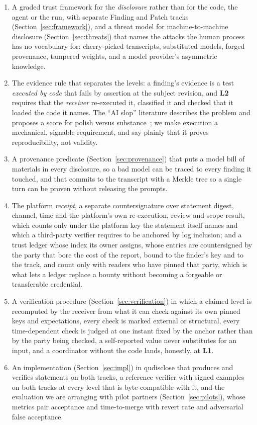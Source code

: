 \documentclass[11pt]{article}
\newcommand{\lvl}[1]{\textbf{L#1}}
\begin{document}
\begin{enumerate}
  \item A graded trust framework for the \emph{disclosure} rather than for the code, the agent or the run, with separate Finding and Patch tracks (Section~\ref{sec:framework}), and a threat model for machine-to-machine disclosure (Section~\ref{sec:threats}) that names the attacks the human process has no vocabulary for: cherry-picked transcripts, substituted models, forged provenance, tampered weights, and a model provider's asymmetric knowledge.
  \item The evidence rule that separates the levels: a finding's evidence is a test \emph{executed by code} that fails by assertion at the subject revision, and \lvl{2} requires that the \emph{receiver} re-executed it, classified it and checked that it loaded the code it names. The ``AI slop'' literature describes the problem and proposes a score for polish versus substance~\cite{slopsurvey}; we make execution a mechanical, signable requirement, and say plainly that it proves reproducibility, not validity.
  \item A provenance predicate (Section~\ref{sec:provenance}) that puts a model bill of materials in every disclosure, so a bad model can be traced to every finding it touched, and that commits to the transcript with a Merkle tree so a single turn can be proven without releasing the prompts.
  \item The platform \emph{receipt}, a separate countersignature over statement digest, channel, time and the platform's own re-execution, review and scope result, which counts only under the platform key the statement itself names and which a third-party verifier requires to be anchored by log inclusion; and a trust ledger whose index its owner assigns, whose entries are countersigned by the party that bore the cost of the report, bound to the finder's key and to the track, and count only with readers who have pinned that party, which is what lets a ledger replace a bounty without becoming a forgeable or transferable credential.
  \item A verification procedure (Section~\ref{sec:verification}) in which a claimed level is recomputed by the receiver from what it can check against its own pinned keys and expectations, every check is marked external or structural, every time-dependent check is judged at one instant fixed by the anchor rather than by the party being checked, a self-reported value never substitutes for an input, and a coordinator without the code lands, honestly, at \lvl{1}.
  \item An implementation (Section~\ref{sec:impl}) in qudisclose that produces and verifies statements on both tracks, a reference verifier with signed examples on both tracks at every level that is byte-compatible with it, and the evaluation we are arranging with pilot partners (Section~\ref{sec:pilots}), whose metrics pair acceptance and time-to-merge with revert rate and adversarial false acceptance.
\end{enumerate}
\end{document}
